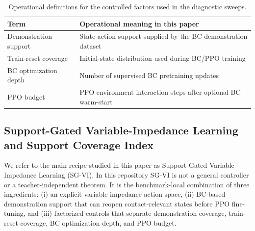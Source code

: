 ﻿\documentclass[11pt]{article}
\begin{document}
\begin{table}[t]
  \centering
  \small
  \caption{Operational definitions for the controlled factors used in the diagnostic sweeps.}
  \label{tab:factor_definitions}
  \begin{tabular}{ll}
    \toprule
    Term & Operational meaning in this paper \\
    \midrule
    Demonstration support & State-action support supplied by the BC demonstration dataset \\
    Train-reset coverage & Initial-state distribution used during BC/PPO training \\
    BC optimization depth & Number of supervised BC pretraining updates \\
    PPO budget & PPO environment interaction steps after optional BC warm-start \\
    \bottomrule
  \end{tabular}
\end{table}

\subsection{Support-Gated Variable-Impedance Learning and Support Coverage Index}

We refer to the main recipe studied in this paper as Support-Gated Variable-Impedance Learning
(SG-VI). In this repository SG-VI is not a general controller or a teacher-independent theorem. It
is the benchmark-local combination of three ingredients: (i) an explicit variable-impedance action
space, (ii) BC-based demonstration support that can reopen contact-relevant states before PPO
fine-tuning, and (iii) factorized controls that separate demonstration coverage, train-reset
coverage, BC optimization depth, and PPO budget.
\end{document}

